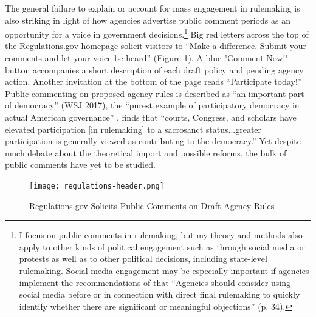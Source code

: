 The general failure to explain or account for mass engagement in rulemaking is also striking in light of how agencies advertise public comment periods as an opportunity for a voice in government decisions.\footnote{
I focus on public comments in rulemaking, but my theory and methods also apply to other kinds of political engagement such as through social media or protests as well as to other political decisions, including state-level rulemaking. Social media engagement may be especially important if agencies implement the recommendations of \citet{ACUS2018} that ``Agencies should consider using social media before or in connection with direct final rulemaking to quickly identify whether there are significant or meaningful objections'' (p. 34). 
} 
Big red letters across the top of the Regulations.gov homepage solicit visitors to ``Make a difference. Submit your comments and let your voice be heard'' (Figure \ref{fig:regs.gov}). A blue "Comment Now!" button accompanies a short description of each draft policy and pending agency action. 
Another invitation at the bottom of the page reads ``Participate today!''
Public commenting on proposed agency rules is described as ``an important part of democracy'' (WSJ 2017), the ``purest example of participatory democracy in actual American governance'' \citep{Herz2016}. \citet{Rossi1997} finds that ``courts, Congress, and scholars have elevated participation [in rulemaking] to a sacrosanct status...greater participation is generally viewed as contributing to the democracy.'' %
Yet despite much debate about the theoretical import and possible reforms, the bulk of public comments have yet to be studied.

\begin{figure}[]
    \centering
    \caption{Regulations.gov Solicits Public Comments on Draft Agency Rules}
    \label{fig:regs.gov}
    
    \texttt{[image: regulations-header.png]}
\end{figure}

